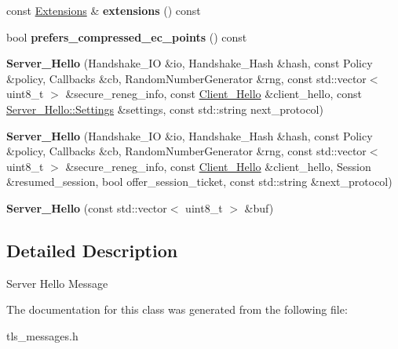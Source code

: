 \begin{DoxyCompactItemize}
const \hyperlink{class_botan_1_1_t_l_s_1_1_extensions}{Extensions} \& {\bfseries extensions} () const
\item 
\mbox{\label{class_botan_1_1_t_l_s_1_1_server___hello_a4d8cad563a24d80b8535f243f338a706}} 
bool {\bfseries prefers\+\_\+compressed\+\_\+ec\+\_\+points} () const
\item 
\mbox{\label{class_botan_1_1_t_l_s_1_1_server___hello_a82204a2faf1ca574f88c51f70b0bb582}} 
{\bfseries Server\+\_\+\+Hello} (Handshake\+\_\+\+IO \&io, Handshake\+\_\+\+Hash \&hash, const Policy \&policy, Callbacks \&cb, Random\+Number\+Generator \&rng, const std\+::vector$<$ uint8\+\_\+t $>$ \&secure\+\_\+reneg\+\_\+info, const \hyperlink{class_botan_1_1_t_l_s_1_1_client___hello}{Client\+\_\+\+Hello} \&client\+\_\+hello, const \hyperlink{class_botan_1_1_t_l_s_1_1_server___hello_1_1_settings}{Server\+\_\+\+Hello\+::\+Settings} \&settings, const std\+::string next\+\_\+protocol)
\item 
\mbox{\label{class_botan_1_1_t_l_s_1_1_server___hello_a0cabbc32c43de6c7e8614075db6ca5f3}} 
{\bfseries Server\+\_\+\+Hello} (Handshake\+\_\+\+IO \&io, Handshake\+\_\+\+Hash \&hash, const Policy \&policy, Callbacks \&cb, Random\+Number\+Generator \&rng, const std\+::vector$<$ uint8\+\_\+t $>$ \&secure\+\_\+reneg\+\_\+info, const \hyperlink{class_botan_1_1_t_l_s_1_1_client___hello}{Client\+\_\+\+Hello} \&client\+\_\+hello, Session \&resumed\+\_\+session, bool offer\+\_\+session\+\_\+ticket, const std\+::string \&next\+\_\+protocol)
\item 
\mbox{\label{class_botan_1_1_t_l_s_1_1_server___hello_a7e146c79f28f006242198f67ba9d5f82}} 
{\bfseries Server\+\_\+\+Hello} (const std\+::vector$<$ uint8\+\_\+t $>$ \&buf)
\end{DoxyCompactItemize}


\subsection{Detailed Description}
Server Hello Message 

The documentation for this class was generated from the following file\+:\begin{DoxyCompactItemize}
\item 
tls\+\_\+messages.\+h\end{DoxyCompactItemize}
